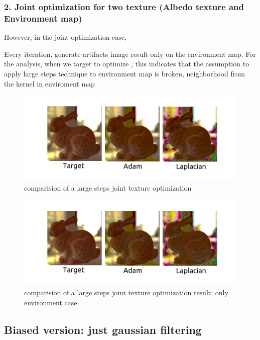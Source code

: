 \subsubsection{2. Joint optimization for two texture (Albedo texture and Environment map)}

However, in the joint optimization case, 

Every iteration, generate artifacts image result only on the environment map. For the analysis, when we target to optimize , this indicates that the assumption to apply large steps technique to environment map is broken, neighborhood from the kernel in enviroment map

\begin{figure}[!h]
    \includegraphics[width=\textwidth]{figures/result-2.png}
    \caption{comparision of a large steps joint texture optimization}
    \label{fig:joint-texture-comparision-laplacian}
\end{figure}

\begin{figure}[!h]
    \includegraphics[width=\textwidth]{figures/result-2-1.png}
    \caption{comparision of a large steps joint texture optimization result: only environment case}
    \label{fig:joint-texture-comparision-laplacian-envmap}
\end{figure}

\newpage
\subsection*{Biased version: just gaussian filtering}

